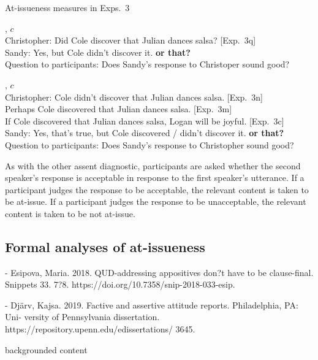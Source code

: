 \documentclass[11pt,fleqn]{article}
\newcommand{\6}{\mbox{$[\hspace*{-.6mm}[$}}
\newcommand{\9}{\mbox{$]\hspace*{-.6mm}]$}}
\begin{document}
\begin{exe}
\ex\label{ai-exps3} At-issueness measures in Exps.~3
\begin{xlist}
, $c$
\\ Christopher: Did Cole discover that Julian dances salsa? \hfill [Exp.~3q]
\\ Sandy: Yes, but Cole didn't discover it. {\bf or that?}
\\ Question to participants: Does Sandy's response to Christoper sound good?

, $c$
\\ Christopher: Cole didn't discover that Julian dances salsa.  \hfill [Exp.~3n]
\\ \hspace*{2cm} Perhaps Cole discovered that Julian dances salsa.  \hfill [Exp.~3m]
\\ \hspace*{2cm} If Cole discovered that Julian dances salsa, Logan will be joyful.  \hfill [Exp.~3c]
\\ Sandy: Yes, that's true, but Cole discovered / didn't discover it. {\bf or that?}
\\ Question to participants: Does Sandy's response to Christopher sound good?

\end{xlist}
\end{exe}
As with the other assent diagnostic, participants are asked whether the second speaker's response is acceptable in response to the first speaker's utterance. If a participant judges the response to be acceptable, the relevant content is taken to be at-issue. If a participant judges the response to be unacceptable, the relevant content is taken to be not at-issue.



\subsection{Formal analyses of at-issueness}

- Esipova, Maria. 2018. QUD-addressing appositives don?t have to be clause-final. Snippets 33. 7?8. https://doi.org/10.7358/snip-2018-033-esip. 

- Dj\"arv, Kajsa. 2019. Factive and assertive attitude reports. Philadelphia, PA: Uni- versity of Pennsylvania dissertation. https://repository.upenn.edu/edissertations/ 3645. 

backgrounded content
\end{document}
